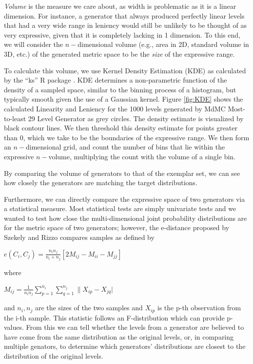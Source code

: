 \documentclass[12pt]{report}
\begin{document}
\textit{Volume} is the measure we care about, as width is problematic as it is a linear dimension.  For instance, a generator that always produced perfectly linear levels that had a very wide range in leniency would still be unlikely to be thought of as very expressive, given that it is completely lacking in 1 dimension.  To this end, we will consider the $n-$dimensional volume (e.g., area in 2D, standard volume in 3D, etc.) of the generated metric space to be the \textit{size} of the expressive range.


To calculate this volume, we use Kernel Density Estimation (KDE) as calculated by the ``ks'' R package \cite{ks}.  KDE determines a non-parametric function of the density of a sampled space, similar to the binning process of a histogram, but typically smooth given the use of a Gaussian kernel.  Figure \ref{fig:KDE} shows the calculated Linearity and Leniency for the 1000 levels generated by MdMC Most-to-least 29 Level Generator as grey circles.  The density estimate is visualized by black contour lines.  We then threshold this density estimate for points greater than 0, which we take to be the boundaries of the expressive range.  We then form an $n-$dimensional grid, and count the number of bins that lie within the expressive $n-$volume, multiplying the count with the volume of a single bin.

By comparing the volume of generators to that of the exemplar set, we can see how closely the generators are matching the target distributions.


Furthermore, we can directly compare the expressive space of two generators via a statistical measure.  Most statistical tests are simply univariate tests and we wanted to test how close the multi-dimensional joint probability distributions are for the metric space of two generators; however, the e-distance proposed by Szekely and Rizzo \cite{szekely2013energy} compares samples as defined by

$e(C_i,C_j) = \frac{n_in_j}{n_i+n_j}[2M_{ij}-M_{ii}-M_{jj}]$

where

$M_{ij} = \frac{1}{n_in_j}\sum_{p=1}^{n_i}\sum_{q=1}^{n_j}\|X_{ip}-X_{jq}|$

and $n_i,n_j$ are the sizes of the two samples and $X_{ip}$ is the p-th observation from the i-th sample.   This statistic follows an F-distribution which can provide p-values.  From this we can tell whether the levels from a generator are believed to have come from the same distribution as the original levels, or, in comparing multiple genators, to determine which generators' distributions are closest to the distribution of the original levels.  
\end{document}
